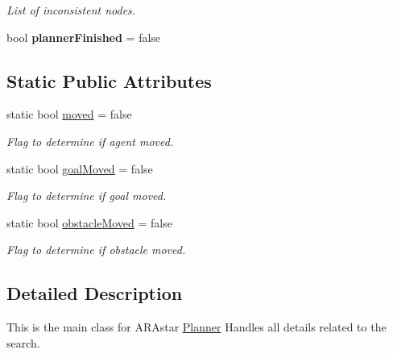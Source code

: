 \begin{DoxyCompactItemize}
\begin{DoxyCompactList}\small\item\em List of inconsistent nodes. \end{DoxyCompactList}\item 
\hypertarget{class_a_r_astar_planner_a94ca878be05551532a686abeb4a1d66e}{bool {\bfseries planner\-Finished} = false}\label{class_a_r_astar_planner_a94ca878be05551532a686abeb4a1d66e}

\end{DoxyCompactItemize}
\subsection*{Static Public Attributes}
\begin{DoxyCompactItemize}
\item 
\hypertarget{class_a_r_astar_planner_a1e8434cfc5c8f0f3e6bd09e585296439}{static bool \hyperlink{class_a_r_astar_planner_a1e8434cfc5c8f0f3e6bd09e585296439}{moved} = false}\label{class_a_r_astar_planner_a1e8434cfc5c8f0f3e6bd09e585296439}

\begin{DoxyCompactList}\small\item\em Flag to determine if agent moved. \end{DoxyCompactList}\item 
\hypertarget{class_a_r_astar_planner_aee85a0fdc5f048dfee9cd3c58e2a6c35}{static bool \hyperlink{class_a_r_astar_planner_aee85a0fdc5f048dfee9cd3c58e2a6c35}{goal\-Moved} = false}\label{class_a_r_astar_planner_aee85a0fdc5f048dfee9cd3c58e2a6c35}

\begin{DoxyCompactList}\small\item\em Flag to determine if goal moved. \end{DoxyCompactList}\item 
\hypertarget{class_a_r_astar_planner_acd32a5682197c310f1c4f3660c218eca}{static bool \hyperlink{class_a_r_astar_planner_acd32a5682197c310f1c4f3660c218eca}{obstacle\-Moved} = false}\label{class_a_r_astar_planner_acd32a5682197c310f1c4f3660c218eca}

\begin{DoxyCompactList}\small\item\em Flag to determine if obstacle moved. \end{DoxyCompactList}\end{DoxyCompactItemize}


\subsection{Detailed Description}
This is the main class for A\-R\-Astar \hyperlink{class_planner}{Planner} Handles all details related to the search. 

